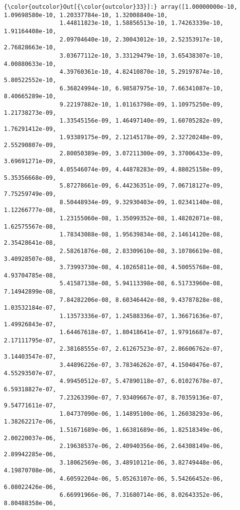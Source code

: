 \documentclass[11pt]{article}
\begin{document}
\begin{Verbatim}[commandchars=\\\{\}]
{\color{outcolor}Out[{\color{outcolor}33}]:} array([1.00000000e-10, 1.09698580e-10, 1.20337784e-10, 1.32008840e-10,
                1.44811823e-10, 1.58856513e-10, 1.74263339e-10, 1.91164408e-10,
                2.09704640e-10, 2.30043012e-10, 2.52353917e-10, 2.76828663e-10,
                3.03677112e-10, 3.33129479e-10, 3.65438307e-10, 4.00880633e-10,
                4.39760361e-10, 4.82410870e-10, 5.29197874e-10, 5.80522552e-10,
                6.36824994e-10, 6.98587975e-10, 7.66341087e-10, 8.40665289e-10,
                9.22197882e-10, 1.01163798e-09, 1.10975250e-09, 1.21738273e-09,
                1.33545156e-09, 1.46497140e-09, 1.60705282e-09, 1.76291412e-09,
                1.93389175e-09, 2.12145178e-09, 2.32720248e-09, 2.55290807e-09,
                2.80050389e-09, 3.07211300e-09, 3.37006433e-09, 3.69691271e-09,
                4.05546074e-09, 4.44878283e-09, 4.88025158e-09, 5.35356668e-09,
                5.87278661e-09, 6.44236351e-09, 7.06718127e-09, 7.75259749e-09,
                8.50448934e-09, 9.32930403e-09, 1.02341140e-08, 1.12266777e-08,
                1.23155060e-08, 1.35099352e-08, 1.48202071e-08, 1.62575567e-08,
                1.78343088e-08, 1.95639834e-08, 2.14614120e-08, 2.35428641e-08,
                2.58261876e-08, 2.83309610e-08, 3.10786619e-08, 3.40928507e-08,
                3.73993730e-08, 4.10265811e-08, 4.50055768e-08, 4.93704785e-08,
                5.41587138e-08, 5.94113398e-08, 6.51733960e-08, 7.14942899e-08,
                7.84282206e-08, 8.60346442e-08, 9.43787828e-08, 1.03532184e-07,
                1.13573336e-07, 1.24588336e-07, 1.36671636e-07, 1.49926843e-07,
                1.64467618e-07, 1.80418641e-07, 1.97916687e-07, 2.17111795e-07,
                2.38168555e-07, 2.61267523e-07, 2.86606762e-07, 3.14403547e-07,
                3.44896226e-07, 3.78346262e-07, 4.15040476e-07, 4.55293507e-07,
                4.99450512e-07, 5.47890118e-07, 6.01027678e-07, 6.59318827e-07,
                7.23263390e-07, 7.93409667e-07, 8.70359136e-07, 9.54771611e-07,
                1.04737090e-06, 1.14895100e-06, 1.26038293e-06, 1.38262217e-06,
                1.51671689e-06, 1.66381689e-06, 1.82518349e-06, 2.00220037e-06,
                2.19638537e-06, 2.40940356e-06, 2.64308149e-06, 2.89942285e-06,
                3.18062569e-06, 3.48910121e-06, 3.82749448e-06, 4.19870708e-06,
                4.60592204e-06, 5.05263107e-06, 5.54266452e-06, 6.08022426e-06,
                6.66991966e-06, 7.31680714e-06, 8.02643352e-06, 8.80488358e-06,

\end{Verbatim}
\end{document}
